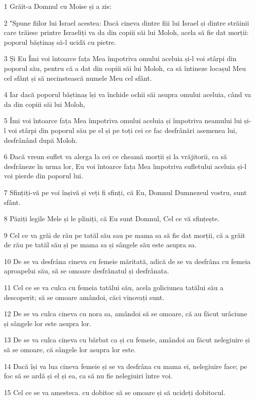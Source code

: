 \par 1 Grăit-a Domnul cu Moise și a zis:
\par 2 "Spune fiilor lui Israel acestea: Dacă cineva dintre fiii lui Israel și dintre străinii care trăiesc printre Israeliți va da din copiii săi lui Moloh, acela să fie dat morții: poporul băștinaș să-l ucidă cu pietre.
\par 3 Și Eu Îmi voi întoarce fața Mea împotriva omului aceluia și-l voi stârpi din poporul său, pentru că a dat din copiii săi lui Moloh, ca să întineze locașul Meu cel sfânt și să necinstească numele Meu cel sfânt.
\par 4 Iar dacă poporul băștinaș își va închide ochii săi asupra omului aceluia, când va da din copiii săi lui Moloh,
\par 5 Îmi voi întoarce fața Mea împotriva omului aceluia și împotriva neamului lui și-l voi stârpi din poporul său pe el și pe toți cei ce fac desfrânări asemenea lui, desfrânând după Moloh.
\par 6 Dacă vreun suflet va alerga la cei ce cheamă morții și la vrăjitorii, ca să desfrâneze în urma lor, Eu voi întoarce fața Mea împotriva sufletului aceluia și-l voi pierde din poporul lui.
\par 7 Sfințiți-vă pe voi înșivă și veți fi sfinți, că Eu, Domnul Dumnezeul vostru, sunt sfânt.
\par 8 Păziți legile Mele și le pliniți, că Eu sunt Domnul, Cel ce vă sfințește.
\par 9 Cel ce va grăi de rău pe tatăl său sau pe mama sa să fie dat morții, că a grăit de rău pe tatăl său și pe mama sa și sângele său este asupra sa.
\par 10 De se va desfrâna cineva cu femeie măritată, adică de se va desfrâna cu femeia aproapelui său, să se omoare desfrânatul și desfrânata.
\par 11 Cel ce se va culca cu femeia tatălui său, acela goliciunea tatălui său a descoperit; să se omoare amândoi, căci vinovați sunt.
\par 12 De se va culca cineva cu nora sa, amândoi să se omoare, că au făcut urâciune și sângele lor este asupra lor.
\par 13 De se va culca cineva cu bărbat ca și cu femeie, amândoi au făcut nelegiuire și să se omoare, că sângele lor asupra lor este.
\par 14 Dacă își va lua cineva femeie și se va desfrâna cu mama ei, nelegiuire face; pe foc să se ardă și el și ea, ca să nu fie nelegiuiri între voi.
\par 15 Cel ce se va amesteca. cu dobitoc să se omoare și să ucideți dobitocul.
